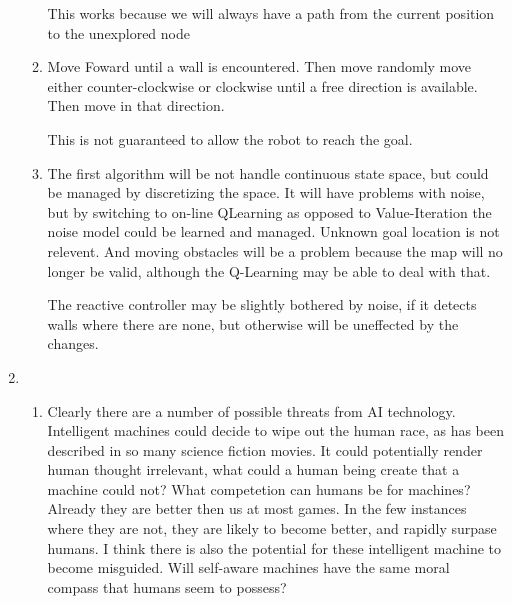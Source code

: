 \documentclass[11pt,fleqn]{article}
\begin{document}
\begin{enumerate}
\begin{enumerate}
This works because we will always have a path from the current position to the unexplored node
\item 
Move Foward until a wall is encountered. Then move randomly move either counter-clockwise or clockwise until a free direction is available. Then move in that direction. 

This is not guaranteed to allow the robot to reach the goal. 
\item 
The first algorithm will be not handle continuous state space, but could be managed by discretizing the space. It will have problems with noise, but by switching to on-line QLearning as opposed to Value-Iteration the noise model could be learned and managed. Unknown goal location is not relevent. And moving obstacles will be a problem because the map will no longer be valid, although the Q-Learning may be able to deal with that.

The reactive controller may be slightly bothered by noise, if it detects walls where there are none, but otherwise will be uneffected by the changes. 

\end{enumerate}

\item %
\begin{enumerate}
\item 
Clearly there are a number of possible threats from AI technology. Intelligent machines could decide to wipe out the human race, as has been described in so many science fiction movies. It could potentially render human thought irrelevant, what could a human being create that a machine could not? What competetion can humans be for machines? Already they are better then us at most games. In the few instances where they are not, they are likely to become better, and rapidly surpase humans. I think there is also the potential for these intelligent machine to become misguided. Will self-aware machines have the same moral compass that humans seem to possess?


\end{enumerate}
\end{enumerate}
\end{document}
